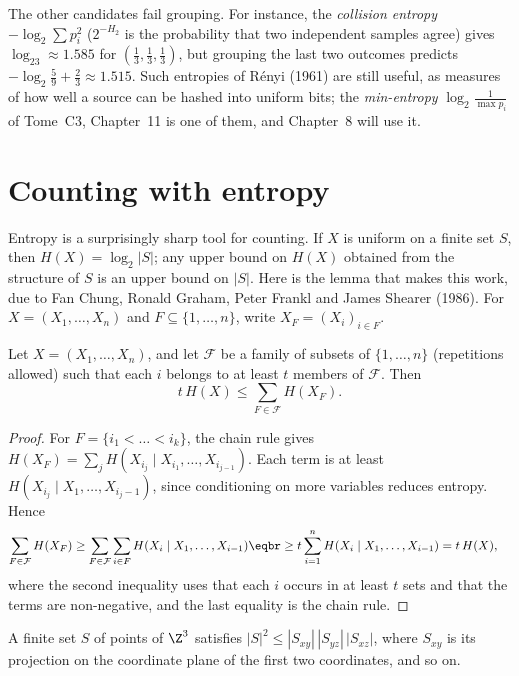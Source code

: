 The other candidates fail grouping. For instance, the \emph{collision entropy} $-\log_2\sum p_i^2$ ($2^{-H_2}$ is the probability that two independent samples agree) gives $\log_23\approx1.585$ for $(\frac13,\frac13,\frac13)$, but grouping the last two outcomes predicts $-\log_2\frac59+\frac23\approx1.515$. Such entropies of R\'enyi (1961) are still useful, as measures of how well a source can be hashed into uniform bits; the \emph{min-entropy} $\log_2\frac1{\max p_i}$ of Tome~C3, Chapter~11 is one of them, and Chapter~8 will use it.

\section{Counting with entropy}\label{sec:shearer}

Entropy is a surprisingly sharp tool for counting. If $X$ is uniform on a finite set $S$, then $H(X)=\log_2|S|$; any upper bound on $H(X)$ obtained from the structure of $S$ is an upper bound on $|S|$. Here is the lemma that makes this work, due to Fan Chung, Ronald Graham, Peter Frankl and James Shearer (1986). For $X=(X_1,\dots,X_n)$ and $F\subseteq\{1,\dots,n\}$, write $X_F=(X_i)_{i\in F}$.

\begin{theorem}\label{thm:shearer}
Let $X=(X_1,\dots,X_n)$, and let $\mathcal F$ be a family of subsets of $\{1,\dots,n\}$ (repetitions allowed) such that each $i$ belongs to at least $t$ members of $\mathcal F$. Then
\[
t\,H(X)\le\sum_{F\in\mathcal F}H(X_F).
\]
\end{theorem}

\begin{proof}
For $F=\{i_1<\dots<i_k\}$, the chain rule gives $H(X_F)=\sum_{j}H(X_{i_j}\mid X_{i_1},\dots,X_{i_{j-1}})$. Each term is at least $H(X_{i_j}\mid X_1,\dots,X_{i_j-1})$, since conditioning on more variables reduces entropy. Hence
\[
\begin{aligned}\sum_{F\in\mathcal F}H(X_F)&\ge\sum_{F\in\mathcal F}\sum_{i\in F}H(X_i\mid X_1,\dots,X_{i-1})\eqbr\ge t\sum_{i=1}^nH(X_i\mid X_1,\dots,X_{i-1})=t\,H(X),\end{aligned}
\]
where the second inequality uses that each $i$ occurs in at least $t$ sets and that the terms are non-negative, and the last equality is the chain rule.
\end{proof}

\begin{corollary}\label{cor:loomis}
A finite set $S$ of points of $\Z^3$ satisfies $|S|^2\le|S_{xy}|\,|S_{yz}|\,|S_{xz}|$, where $S_{xy}$ is its projection on the coordinate plane of the first two coordinates, and so on.
\end{corollary}


